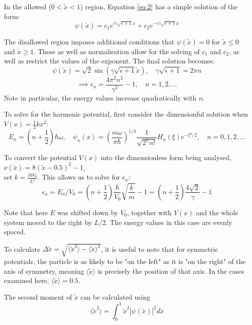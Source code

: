 \documentclass[11pt]{article}
\begin{document}
In the allowed ($0<\tilde{x}<1$) region, Equation \ref{eq:2} has
a simple solution of the form:
$$\psi(\tilde{x})=c_1 e^{i \gamma \sqrt{\epsilon+1} x} +c_2 e^{-i \gamma \sqrt{\epsilon+1} x}$$

The disallowed region imposes additional conditions that $\psi(\tilde{x})=0$
for $\tilde{x}\leq0$ and $\tilde{x}\geq1$. These as well as normalisation
allow for the solving of $c_1$ and
$c_2$, as well as restrict the values of the exponent.
The final solution becomes:
\begin{equation}
  \psi(\tilde{x})=\sqrt{2}\sin(\gamma \sqrt{\epsilon+1} \tilde{x}),\quad \gamma\sqrt{\epsilon+1}=2\pi n
\end{equation}
\begin{equation}
  \implies \epsilon_n=\frac{4\pi^2n^2}{\gamma^2}-1,\quad n=1,2,...
  \label{eq:epsilon}
\end{equation}
Note in particular, the energy values increase quadratically with $n$.

To solve for the harmonic potential, first consider the dimensionful solution when
$V(x)=\frac{1}{2}k x^2$\cite{grif}:
\begin{equation}
  E_n=(n+\frac{1}{2})\hbar \omega,
  \quad \psi_n(x)=\left(\frac{m\omega}{\pi \hbar}\right)^{1/4}\frac{1}{\sqrt{2^n n!}}H_n(\xi)e^{-\xi^2/2},
  \quad n=0,1,2,...
\end{equation}

To convert the potential $V(x)$ into the dimensionless form being analysed,
$\nu(\tilde{x})=8(\tilde{x}-0.5)^2-1$,\\
 set $k=  \frac{16V_0}{L^2}$.  This allows us to solve for $\epsilon_n$:
\begin{equation}
  \epsilon_n=E_n/V_0=(n+\frac{1}{2})\frac{\hbar}{V_0}\sqrt{\frac{k}{m}}-1=
  (n+\frac{1}{2})\frac{4\sqrt{2}}{\gamma}-1
\end{equation}

Note that here $E$ was shifted down by $V_0$, together with $V(x)$ and
the whole system moved to the right by $L/2$.
The energy values in this case are evenly spaced.

To calculate $\Delta \tilde{x}=\sqrt{\langle \tilde{x}^2\rangle-\langle\tilde{x}\rangle^2}$,
it is useful to note that for symmetric potentials, the particle is as likely to be 
"on the left" as it is "on the right" of the axis of symmetry, meaning $\langle \tilde{x}\rangle$
is precisely the position of that axis. In the cases examined here, 
$\langle \tilde{x} \rangle=0.5$.

The second moment of $\tilde{x}$ can be calculated using
\begin{equation}
  \langle\tilde{x}^2\rangle=\int_0^1 \tilde{x}^2|\psi(\tilde{x})|^2d\tilde{x}
\end{equation}
\end{document}
